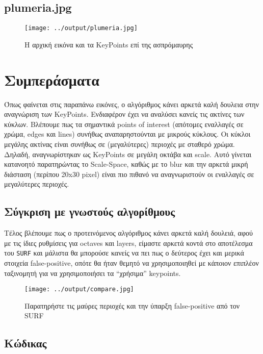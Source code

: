 \documentclass[11pt]{scrartcl} %
\begin{document}
\subsection{plumeria.jpg}
\begin{figure}[H]
  \centerline{\texttt{[image: ../output/plumeria.jpg]}}
  \caption{H αρχική εικόνα και τα KeyPoints επί της ασπρόμαυρης}
\end{figure}

\section{Συμπεράσματα}

Όπως φαίνεται στις παραπάνω εικόνες, ο αλγόριθμος κάνει αρκετά καλή δουλεια στην αναγνώριση των KeyPoints.
Ενδιαφέρον έχει να αναλύσει κανείς τις ακτίνες των κύκλων. Βλέπουμε πως τα σημαντικά points of interest
(απότομες εναλλαγές σε χρώμα, edges και lines) συνήθως αναπαρηστούνται με μικρούς κύκλους.
Οι κύκλοι μεγάλης ακτίνας είναι συνήθως σε (μεγαλύτερες) περιοχές με σταθερό χρώμα. Δηλαδή, αναγνωρίστηκαν ως
KeyPoints σε μεγάλη οκτάβα και scale. Aυτό γίνεται κατανοητό παρατηρώντας το Scale-Space, καθώς με το
blur και την αρκετά μικρή διάσταση (περίπου 20x30 pixel) είναι πιο πιθανό να αναγνωριστούν
οι εναλλαγές σε μεγαλύτερες περιοχές.

\subsection{Σύγκριση με γνωστούς αλγορίθμους}
Τέλος βλέπουμε πως ο προτεινόμενος αλγόριθμος κάνει αρκετά καλή δουλειά, αφού με τις ίδιες ρυθμίσεις για
octaves και layers, είμαστε αρκετά κοντά στο αποτέλεσμα του \texttt{SURF} και μάλιστα θα μπορούσε κανείς
να πει πως ο δεύτερος έχει και μερικά στοιχεία false-positive, οπότε θα ήταν θεμητό να χρησιμοποιηθεί με
κάποιον επιπλέον ταξινομητή για να χρησιμοποιήσει τα ``χρήσιμα'' keypoints.

\begin{figure}[H]
  \centerline{\texttt{[image: ../output/compare.jpg]}}
  \caption{Παρατηρήστε τις μαύρες περιοχές και την ύπαρξη false-positive από τον SURF}
\end{figure}

\subsection{Κώδικας}
\end{document}
